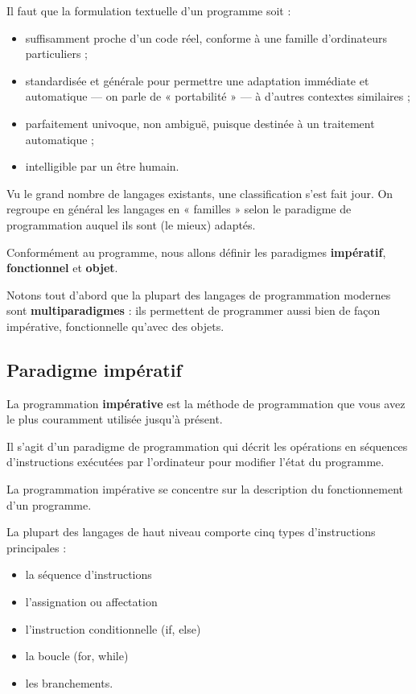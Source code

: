 \documentclass[
  a4paper,
  DIV=11,
  numbers=noendperiod]{scrartcl}
\providecommand{\tightlist}{%
  \setlength{\itemsep}{0pt}\setlength{\parskip}{0pt}}\usepackage{longtable,booktabs,array}
\begin{document}
Il faut que la formulation textuelle d'un programme soit :

\begin{itemize}
\tightlist
\item
  suffisamment proche d'un code réel, conforme à une famille
  d'ordinateurs particuliers ;
\item
  standardisée et générale pour permettre une adaptation immédiate et
  automatique --- on parle de « portabilité » --- à d'autres contextes
  similaires ;
\item
  parfaitement univoque, non ambiguë, puisque destinée à un traitement
  automatique ;
\item
  intelligible par un être humain.
\end{itemize}

Vu le grand nombre de langages existants, une classification s'est fait
jour. On regroupe en général les langages en « familles » selon le
paradigme de programmation auquel ils sont (le mieux) adaptés.

Conformément au programme, nous allons définir les paradigmes
\textbf{impératif}, \textbf{fonctionnel} et \textbf{objet}.

Notons tout d'abord que la plupart des langages de programmation
modernes sont \textbf{multiparadigmes} : ils permettent de programmer
aussi bien de façon impérative, fonctionnelle qu'avec des objets.

\hypertarget{paradigme-impuxe9ratif}{%
\subsection{Paradigme impératif}\label{paradigme-impuxe9ratif}}

La programmation \textbf{impérative} est la méthode de programmation que
vous avez le plus couramment utilisée jusqu'à présent.

Il s'agit d'un paradigme de programmation qui décrit les opérations en
séquences d'instructions exécutées par l'ordinateur pour modifier l'état
du programme.

La programmation impérative se concentre sur la description du
fonctionnement d'un programme.

La plupart des langages de haut niveau comporte cinq types
d'instructions principales :

\begin{itemize}
\tightlist
\item
  la séquence d'instructions
\item
  l'assignation ou affectation
\item
  l'instruction conditionnelle (if, else)
\item
  la boucle (for, while)
\item
  les branchements.
\end{itemize}
\end{document}
